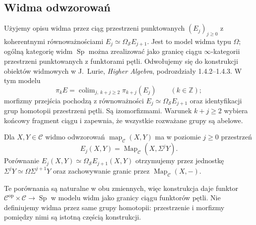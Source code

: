 \subsection{Widma odwzorowań}

Użyjemy opisu widma przez ciąg przestrzeni punktowanych $(E_j)_{j\geq0}$ z koherentnymi równoważnościami $E_j\simeq\Omega_{\mathcal S} E_{j+1}$. Jest to model widma typu $\Omega$; ogólną kategorię widm $\operatorname{Sp}$ można zrealizować jako granicę ciągu $\infty$-kategorii przestrzeni punktowanych z funktorami pętli. Odwołujemy się do konstrukcji obiektów widmowych w J.~Lurie, \emph{Higher Algebra}, podrozdziały 1.4.2--1.4.3. W tym modelu
\[
 \pi_k E=\mathop{\operatorname{colim}}_{j,\ k+j\geq2}\pi_{k+j}(E_j)
 \qquad(k\in\mathbb Z);
\]
morfizmy przejścia pochodzą z równoważności $E_j\simeq\Omega_{\mathcal S}E_{j+1}$ oraz identyfikacji grup homotopii przestrzeni pętli. Są izomorfizmami. Warunek $k+j\geq2$ wybiera końcowy fragment ciągu i zapewnia, że wszystkie rozważane grupy są abelowe.

\begin{definicja}\label{cat:def:stable-mapping-spectrum}
Dla $X,Y\in\mathcal C$ widmo odwzorowań $\operatorname{map}_{\mathcal C}(X,Y)$ ma w poziomie $j\geq0$ przestrzeń
\[
 E_j(X,Y)=\operatorname{Map}_{\mathcal C}(X,\Sigma^jY).
\]
Porównanie $E_j(X,Y)\simeq\Omega_{\mathcal S}E_{j+1}(X,Y)$ otrzymujemy przez jednostkę $\Sigma^jY\simeq\Omega\Sigma^{j+1}Y$ oraz zachowywanie granic przez $\operatorname{Map}_{\mathcal C}(X,-)$.
\end{definicja}

Te porównania są naturalne w obu zmiennych, więc konstrukcja daje funktor $\mathcal C^{\mathrm{op}}\times\mathcal C\to\operatorname{Sp}$ w modelu widm jako granicy ciągu funktorów pętli. Nie definiujemy widma przez same grupy homotopii: przestrzenie i morfizmy pomiędzy nimi są istotną częścią konstrukcji.

